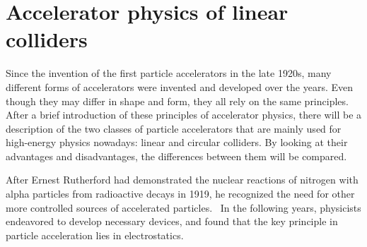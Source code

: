 \chapter{Accelerator physics of linear colliders}
\label{LinearColliderPhysics}

\begin{chapterabstract}
Since the invention of the first particle accelerators in the late 1920s, many different forms of accelerators were invented and developed over the years. 
Even though they may differ in shape and form, they all rely on the same principles. 
After a brief introduction of these principles of accelerator physics, there will be a description of the two classes of particle accelerators that are mainly used for high-energy physics nowadays: linear and circular colliders. 
By looking at their advantages and disadvantages, the differences between them will be compared.
\end{chapterabstract}
\newline

After Ernest Rutherford had demonstrated the nuclear reactions of nitrogen with alpha particles from radioactive decays in 1919, he recognized the need for other more controlled sources of accelerated particles.~\cite{Rutherford}
In the following years, physicists endeavored to develop necessary devices, and found that the key principle in particle acceleration lies in electrostatics.~\cite[p. 3f]{Livingston}

